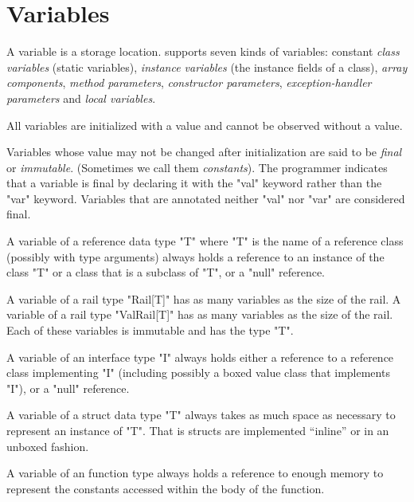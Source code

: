
\chapter{Variables}\label{XtenVariables}

A variable is a storage location. 
\Xten{} supports seven kinds of variables: constant {\em class
variables} (static variables), {\em instance variables} (the instance
fields of a class), {\em array components}, {\em method parameters},
{\em constructor parameters}, {\em exception-handler parameters} and
{\em local variables}.

All
variables are initialized with a value and cannot be observed
without
a value.

Variables whose value may not be changed after initialization
are said to be {\em final} or {\em immutable}. (Sometimes we call them {\em constants}).
The programmer indicates that a variable is final by declaring
it with the \xcd"val" keyword rather than the \xcd"var" keyword.
Variables that are annotated neither \xcd"val" nor \xcd"var"
are considered final.

A variable of a reference data type \xcd"T" where \xcd"T" is the name
of a reference class (possibly with type arguments) always holds a
reference to an instance of the class \xcd"T" or a class that is a
subclass of \xcd"T", or a \xcd"null" reference.

A variable of a rail type \xcd"Rail[T]" has
as many variables as the size of the rail.
A variable of a rail type \xcd"ValRail[T]" has
as many variables as the size of the rail.
Each of these variables is immutable and has the type \xcd"T".


A variable of an interface type \xcd"I" always holds either a
reference to a reference class implementing \xcd"I" (including possibly
a boxed value class that implements \xcd"I"), or a \xcd"null"
reference.

A variable of a struct data type \xcd"T"  always takes as much
space as necessary to represent an instance of \xcd"T". That is
structs are implemented ``inline'' or in an unboxed fashion.

A variable of an function type always holds a reference to 
enough memory to represent the constants accessed within the body of the function.



